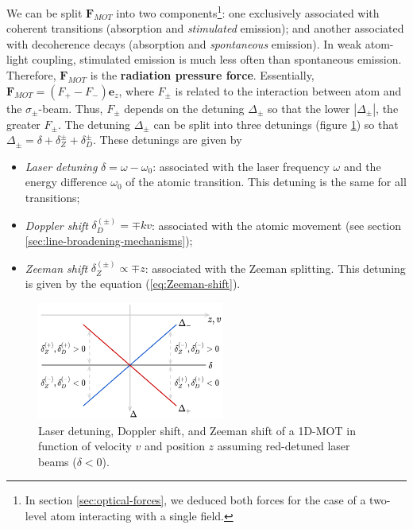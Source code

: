 We can be split $ \mathbf{F}_{MOT} $ into two components\footnote{In section \ref{sec:optical-forces}, we deduced both forces for the case of a two-level atom interacting with a single field.}: one exclusively associated with coherent transitions (absorption and \textit{stimulated} emission); and another associated with decoherence decays (absorption and \textit{spontaneous} emission). In weak atom-light coupling, stimulated emission is much less often than spontaneous emission. Therefore, $ \mathbf{F}_{MOT} $ is the \textbf{radiation pressure force}. Essentially, $ \mathbf{F}_{MOT} = (F_{+} - F_{-}) \mathbf{e}_z $, where $ F_{\pm} $ is related to the interaction between atom and the $ \sigma_{\pm} $-beam. Thus, $ F_{\pm} $ depends on the detuning $ \Delta_{\pm} $ so that the lower $ |\Delta_{\pm}| $, the greater $ F_{\pm} $. The detuning $ \Delta_{\pm} $ can be split into three detunings (figure \ref{fig:detuning-1D-MOT}) so that $ \Delta_{\pm} = \delta + \delta_Z^{\pm} + \delta_D^{\pm} $. These detunings are given by
\begin{itemize}
	\item \textit{Laser detuning} $ \delta = \omega - \omega_0 $: associated with the laser frequency $ \omega $ and the energy difference $ \omega_0 $ of the atomic transition. This detuning is the same for all transitions;

	\item \textit{Doppler shift} $ \delta_{D}^{(\pm)} = \mp k v $: associated with the atomic movement (see section \ref{sec:line-broadening-mechanisms});

	\item \textit{Zeeman shift} $ \delta_Z^{(\pm)} \propto \mp z $: associated with the Zeeman splitting. This detuning is given by the equation (\ref{eq:Zeeman-shift}).
\end{itemize}

\begin{figure}[!ht]
	\centering
	\includegraphics[width=0.55\textwidth]{USPSC-img/1D-MOT-detunings.png}
	\vspace{5pt}
	\caption{Laser detuning, Doppler shift, and Zeeman shift of a 1D-MOT in function of velocity $ v $ and position $ z $ assuming red-detuned laser beams ($ \delta < 0 $).}
	\label{fig:detuning-1D-MOT}
\end{figure}

